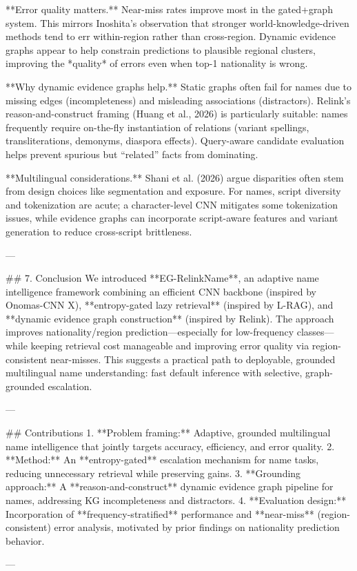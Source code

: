 **Error quality matters.** Near-miss rates improve most in the gated+graph system. This mirrors Inoshita’s observation that stronger world-knowledge-driven methods tend to err within-region rather than cross-region. Dynamic evidence graphs appear to help constrain predictions to plausible regional clusters, improving the *quality* of errors even when top-1 nationality is wrong.

**Why dynamic evidence graphs help.** Static graphs often fail for names due to missing edges (incompleteness) and misleading associations (distractors). Relink’s reason-and-construct framing (Huang et al., 2026) is particularly suitable: names frequently require on-the-fly instantiation of relations (variant spellings, transliterations, demonyms, diaspora effects). Query-aware candidate evaluation helps prevent spurious but “related” facts from dominating.

**Multilingual considerations.** Shani et al. (2026) argue disparities often stem from design choices like segmentation and exposure. For names, script diversity and tokenization are acute; a character-level CNN mitigates some tokenization issues, while evidence graphs can incorporate script-aware features and variant generation to reduce cross-script brittleness.

---

## 7. Conclusion  
We introduced **EG-RelinkName**, an adaptive name intelligence framework combining an efficient CNN backbone (inspired by Onomas-CNN X), **entropy-gated lazy retrieval** (inspired by L-RAG), and **dynamic evidence graph construction** (inspired by Relink). The approach improves nationality/region prediction—especially for low-frequency classes—while keeping retrieval cost manageable and improving error quality via region-consistent near-misses. This suggests a practical path to deployable, grounded multilingual name understanding: fast default inference with selective, graph-grounded escalation.

---

## Contributions  
1. **Problem framing:** Adaptive, grounded multilingual name intelligence that jointly targets accuracy, efficiency, and error quality.  
2. **Method:** An **entropy-gated** escalation mechanism for name tasks, reducing unnecessary retrieval while preserving gains.  
3. **Grounding approach:** A **reason-and-construct** dynamic evidence graph pipeline for names, addressing KG incompleteness and distractors.  
4. **Evaluation design:** Incorporation of **frequency-stratified** performance and **near-miss** (region-consistent) error analysis, motivated by prior findings on nationality prediction behavior.

---